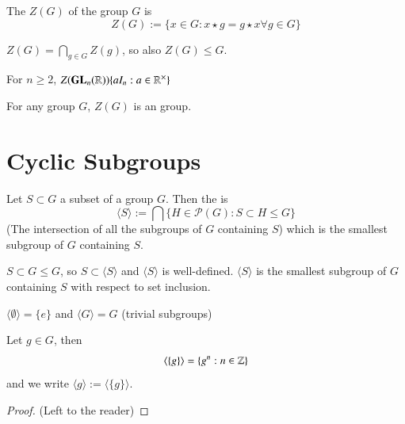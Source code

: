 \documentclass[12pt, a4paper, oneside, openright, titlepage]{book}
\begin{document}
\begin{defn}
    The  $Z(G)$ of the group $G$ is \begin{equation}
        Z(G) := \{x \in G:x\star g = g \star x \forall g \in G\}
    \end{equation}
\end{defn}

\begin{prop}
    $Z(G) = \bigcap_{g \in G} Z(g)$, so also $Z(G) \leq G$.
\end{prop}

\begin{xca}
    For $n \geq 2$, $Z(\mathbf{GL}_n(\mathbb R)) \{aI_n: a \in \mathbb R^{\times}\}$
\end{xca}

\begin{rmk}
    For any group $G$, $Z(G)$ is an  group.
\end{rmk}


\section{\textsection Cyclic Subgroups}


\begin{defn}
    Let $S \subset G$ a subset of a group $G$. Then the  is \begin{equation}
        \langle S\rangle := \bigcap\{H \in \mathcal{P}(G): S \subset H \leq G\}
    \end{equation}
    (The intersection of all the subgroups of $G$ containing $S$) which is the smallest subgroup of $G$ containing $S$.
    \begin{note}
        $S \subset G \leq G$, so $S \subset \langle S \rangle$ and $\langle S \rangle$ is well-defined. $\langle S \rangle$ is the smallest subgroup of $G$ containing $S$ with respect to set inclusion.
    \end{note}
\end{defn}

\begin{eg}
    $\langle \emptyset\rangle = \{e\}$ and $\langle G \rangle = G$ (trivial subgroups)
\end{eg}

\begin{prop}
    Let $g \in G$, then \begin{equation}
        \langle \{g\}\rangle = \{g^n:n \in \mathbb Z\}
    \end{equation}
    and we write $\langle g \rangle := \langle \{g\}\rangle$.
    \begin{proof}
        (Left to the reader)
    \end{proof}
\end{prop}
\end{document}
